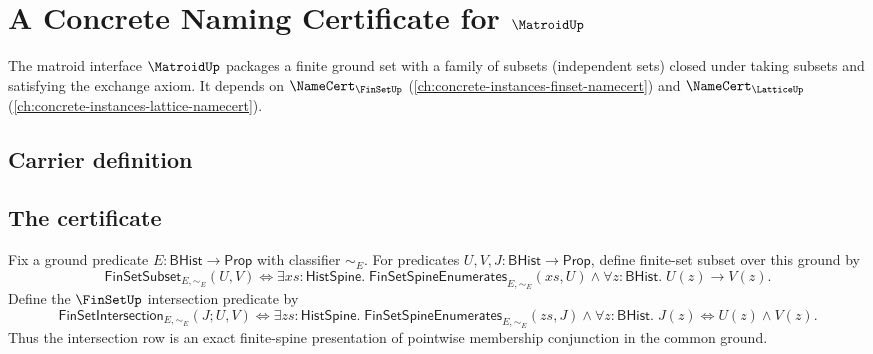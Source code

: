\chapter{A Concrete Naming Certificate for $\MatroidUp$}
\label{ch:concrete-instances-matroid-namecert}

The matroid interface $\MatroidUp$ packages a finite ground set with a family of subsets (independent sets) closed under taking subsets and satisfying the exchange axiom. It depends on $\NameCert_{\FinSetUp}$ (\autoref{ch:concrete-instances-finset-namecert}) and $\NameCert_{\LatticeUp}$ (\autoref{ch:concrete-instances-lattice-namecert}).

\section{Carrier definition}
\label{sec:matroid-carrier}

\section{The certificate}
\label{sec:matroid-certificate}

\begin{definition}
\label{def:matroid-finset-subset-and-intersection}
Fix a ground predicate $E:\mathsf{BHist}\to\mathsf{Prop}$ with classifier $\sim_E$. For predicates $U,V,J:\mathsf{BHist}\to\mathsf{Prop}$, define finite-set subset over this ground by
$$
\mathsf{FinSetSubset}_{E,\sim_E}(U,V)
\Longleftrightarrow
\exists xs:\mathsf{HistSpine}.\;
\mathsf{FinSetSpineEnumerates}_{E,\sim_E}(xs,U)
\land
\forall z:\mathsf{BHist}.\;U(z)\to V(z).
$$
Define the $\FinSetUp$ intersection predicate by
$$
\mathsf{FinSetIntersection}_{E,\sim_E}(J;U,V)
\Longleftrightarrow
\exists zs:\mathsf{HistSpine}.\;
\mathsf{FinSetSpineEnumerates}_{E,\sim_E}(zs,J)
\land
\forall z:\mathsf{BHist}.\;J(z)\Longleftrightarrow U(z)\land V(z).
$$
Thus the intersection row is an exact finite-spine presentation of pointwise membership conjunction in the common ground.
\end{definition}

